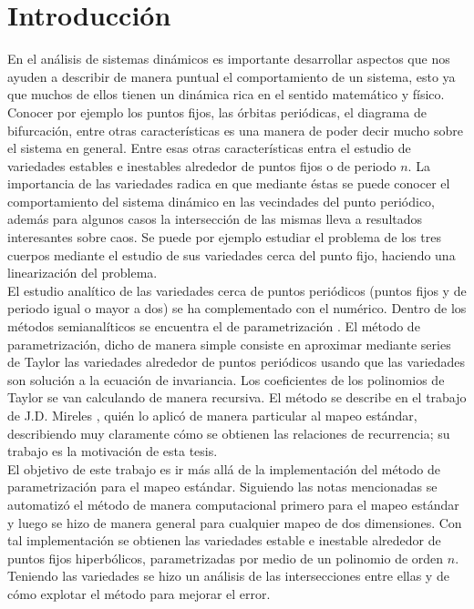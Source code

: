 
\chapter{Introducción}
En el análisis de sistemas dinámicos es importante desarrollar aspectos que nos ayuden a describir de manera puntual el comportamiento de un sistema, esto ya que muchos de ellos tienen un dinámica rica en el sentido matemático y físico. Conocer por ejemplo los puntos fijos, las órbitas periódicas, el diagrama de bifurcación, entre otras características es una manera de poder decir mucho sobre el sistema en general. Entre esas otras características entra el estudio de variedades estables e inestables alrededor de puntos fijos o de periodo $n$. La importancia de las variedades radica en que mediante éstas se puede conocer el comportamiento del sistema dinámico en las vecindades del punto periódico, además para algunos casos la intersección de las mismas lleva a resultados interesantes sobre caos.  Se puede por ejemplo estudiar el problema de los tres cuerpos mediante el estudio de sus variedades cerca del punto fijo, haciendo una linearización del problema.\\


El estudio analítico de las variedades cerca de puntos periódicos (puntos fijos y de periodo igual o mayor a dos) se ha complementado con el numérico. Dentro de los métodos semianalíticos se encuentra el de parametrización \citep{Haro}. El método de parametrización, dicho de manera simple consiste en aproximar mediante series de Taylor las variedades alrededor de puntos periódicos usando que las variedades son solución a la ecuación de invariancia. Los coeficientes de los polinomios de Taylor se van calculando de manera recursiva. El método se describe en el trabajo de J.D. Mireles \citep{Mireles}, quién  lo aplicó de manera particular al mapeo estándar, describiendo muy claramente cómo se obtienen las relaciones de recurrencia; su trabajo es la motivación de esta tesis.\\


El objetivo de este trabajo es ir más allá de la implementación del método de parametrización para el mapeo estándar. Siguiendo las notas mencionadas se automatizó el método de manera computacional primero para el mapeo estándar y luego se hizo de manera general para cualquier mapeo de dos dimensiones. Con tal implementación se obtienen las variedades estable e inestable alrededor de puntos fijos hiperbólicos, parametrizadas por medio de un polinomio de orden $n$.
Teniendo las variedades se hizo un análisis de las intersecciones entre ellas y de cómo explotar el método para mejorar el error.
 
